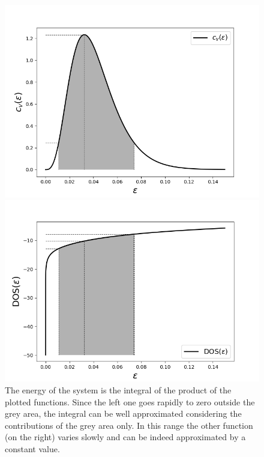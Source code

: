 \documentclass{article}
\begin{document}
\begin{figure}
\centering
\begin{minipage}{0.4\textwidth}
    \includegraphics[scale=0.45]{scripts/cv_eps.png}
\end{minipage}
\hfill
\begin{minipage}{0.45\textwidth}
    \includegraphics[scale=0.45]{scripts/DOS_eps.png}
\end{minipage}
\caption{The energy of the system is the integral of the product of the plotted functions. Since the left one goes rapidly to zero
outside the grey area, the integral can be well approximated considering the contributions of the grey area only. In this range the other function (on the right) varies
slowly and can be indeed approximated by a constant value.}
\label{fig:peak}
\end{figure}
\end{document}
